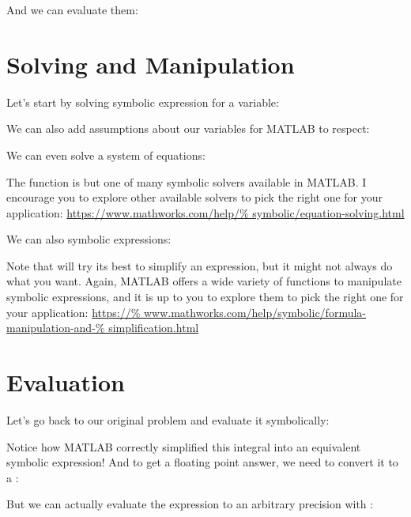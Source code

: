 \documentclass{article}
\begin{document}
And we can evaluate them:


\section{Solving and Manipulation}

Let's start by solving symbolic expression for a variable:


We can also add assumptions about our variables for MATLAB to respect:


We can even solve a system of equations:


The  function is but one of many symbolic solvers available in
MATLAB.  I encourage you to explore other available solvers to pick the
right one for your application: \url{https://www.mathworks.com/help/%
symbolic/equation-solving.html}

We can also  symbolic expressions:


\newpage

Note that  will try its best to simplify an expression, but it
might not always do what you want.  Again, MATLAB offers a wide variety
of functions to manipulate symbolic expressions, and it is up to you to
explore them to pick the right one for your application: \url{https://%
www.mathworks.com/help/symbolic/formula-manipulation-and-%
simplification.html}

\section{Evaluation}

Let's go back to our original problem and evaluate it symbolically:


Notice how MATLAB correctly simplified this integral into an equivalent
symbolic expression!  And to get a floating point answer, we need to
convert it to a :


But we can actually evaluate the expression to an arbitrary precision
with :

\end{document}
